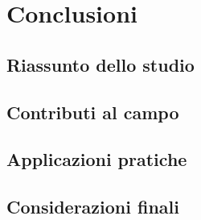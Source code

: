 \chapter{Conclusioni}
    \section{Riassunto dello studio}
    \section{Contributi al campo}
    \section{Applicazioni pratiche}
    \section{Considerazioni finali}
